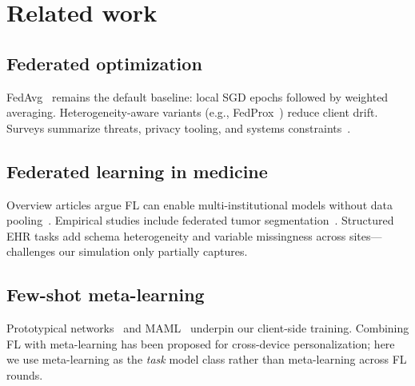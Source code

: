 \section{Related work}
\label{sec:related}

\subsection{Federated optimization}
FedAvg~\citep{mcmahan2017communication} remains the default baseline: local SGD epochs followed by weighted averaging. Heterogeneity-aware variants (e.g., FedProx~\citep{li2020federated}) reduce client drift. Surveys summarize threats, privacy tooling, and systems constraints~\citep{kairouz2021advances}.

\subsection{Federated learning in medicine}
Overview articles argue FL can enable multi-institutional models without data pooling~\citep{rieke2020future}. Empirical studies include federated tumor segmentation~\citep{sheller2020federated}. Structured EHR tasks add schema heterogeneity and variable missingness across sites---challenges our simulation only partially captures.

\subsection{Few-shot meta-learning}
Prototypical networks~\citep{snell2017prototypical} and MAML~\citep{finn2017model} underpin our client-side training. Combining FL with meta-learning has been proposed for cross-device personalization; here we use meta-learning as the \emph{task} model class rather than meta-learning across FL rounds.
